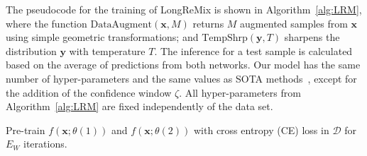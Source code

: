 \documentclass[review]{elsarticle}
\begin{document}
The pseudocode for the training of LongReMix is shown in Algorithm~\ref{alg:LRM}, where the function $\text{DataAugment}(\mathbf{x},M)$ returns $M$ augmented samples from $\mathbf{x}$ using simple geometric transformations; and 
$\text{TempShrp}(\mathbf{y},T)$ sharpens the distribution $\mathbf{y}$ with temperature $T$.
The inference for a test sample is calculated based on the average of predictions from both networks. Our model has the same number of hyper-parameters and the same values as SOTA methods~\cite{li2020dividemix}, except for the addition of the confidence window $\zeta$. All hyper-parameters from Algorithm~\ref{alg:LRM} are fixed independently of the data set.







\begin{algorithm}[t!]
\scriptsize


Pre-train $f(\mathbf{x};\theta(1))$ and $f(\mathbf{x};\theta(2))$ with cross entropy (CE) loss in $\mathcal{D}$ for $E_{W}$ iterations.\\
\end{algorithm}
\end{document}
